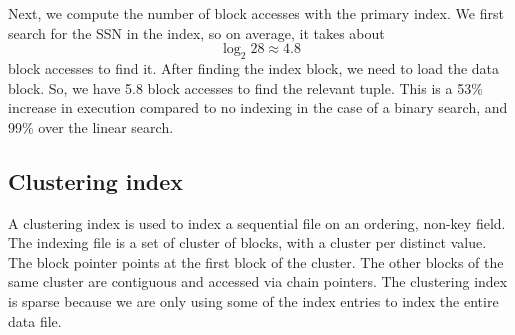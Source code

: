 \documentclass[a4paper, openany]{memoir}
\begin{document}
Next, we compute the number of block accesses with the primary index. We first search for the SSN in the index, so on average, it takes about
\[\log_2 28 \approx 4.8\]
block accesses to find it. After finding the index block, we need to load the data block. So, we have 5.8 block accesses to find the relevant tuple. This is a 53\% increase in execution compared to no indexing in the case of a binary search, and 99\% over the linear search. 
            
            
            

\subsection{Clustering index}
A clustering index is used to index a sequential file on an ordering, non-key field. The indexing file is a set of cluster of blocks, with a cluster per distinct value. The block pointer points at the first block of the cluster. The other blocks of the same cluster are contiguous and accessed via chain pointers. The clustering index is sparse because we are only using some of the index entries to index the entire data file.
\end{document}
